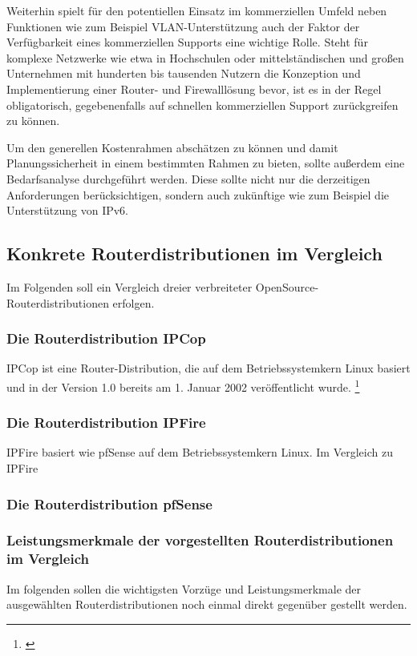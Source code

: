 \documentclass[a4paper,12pt]{scrartcl}
\begin{document}
Weiterhin spielt f\"ur den potentiellen Einsatz im kommerziellen Umfeld
neben Funktionen wie zum Beispiel VLAN-Unterst\"utzung auch der Faktor der
Verf\"ugbarkeit eines kommerziellen Supports eine wichtige Rolle. Steht f\"ur
komplexe Netzwerke wie etwa in Hochschulen oder mittelst\"andischen und
gro\ss{}en Unternehmen mit hunderten bis tausenden Nutzern die Konzeption und
Implementierung einer Router- und Firewalll\"osung bevor, ist es in der Regel
obligatorisch, gegebenenfalls auf schnellen kommerziellen Support
zur\"uckgreifen zu k\"onnen.

Um den generellen Kostenrahmen absch\"atzen zu k\"onnen und damit
Planungssicherheit in einem bestimmten Rahmen zu bieten, sollte au\ss{}erdem
eine Bedarfsanalyse durchgef\"uhrt werden. Diese sollte nicht nur die
derzeitigen Anforderungen ber\"ucksichtigen, sondern auch zuk\"unftige wie zum
Beispiel die Unterst\"utzung von IPv6.
 
\subsection{Konkrete Routerdistributionen im Vergleich}
Im Folgenden soll ein Vergleich dreier verbreiteter OpenSource-
Routerdistributionen erfolgen. 

\subsubsection{Die Routerdistribution IPCop}
IPCop ist eine Router-Distribution, die auf dem Betriebssystemkern Linux
basiert und in der Version 1.0 bereits am 1. Januar 2002 ver\"offentlicht
wurde. \footnote{\cite{IPCopManual}}

\subsubsection{Die Routerdistribution IPFire}
IPFire basiert wie pfSense auf dem Betriebssystemkern Linux. Im Vergleich zu
IPFire 

\subsubsection{Die Routerdistribution pfSense}



\subsubsection{Leistungsmerkmale der vorgestellten Routerdistributionen im
Vergleich}
Im folgenden sollen die wichtigsten Vorz\"uge und Leistungsmerkmale der
ausgew\"ahlten Routerdistributionen noch einmal direkt gegen\"uber gestellt
werden.\\
\end{document}
